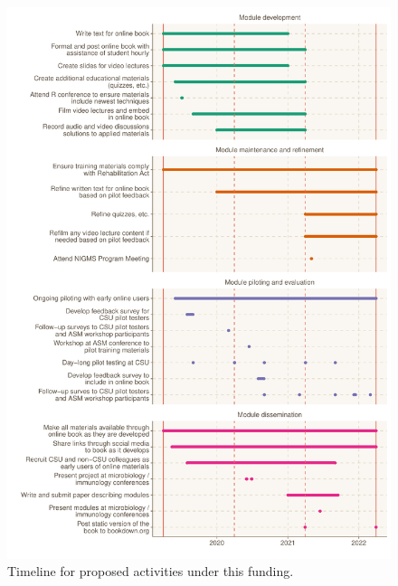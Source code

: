 \documentclass[pdftex,english,11pt,parskip=half]{scrartcl}
\begin{document}
\begin{figure}[ht]
    \includegraphics[width=\textwidth]{figures/timeline.pdf}
    \caption{Timeline for proposed activities under this funding.}
    \label{fig:timeline}
\end{figure}



\clearpage



\end{document}
